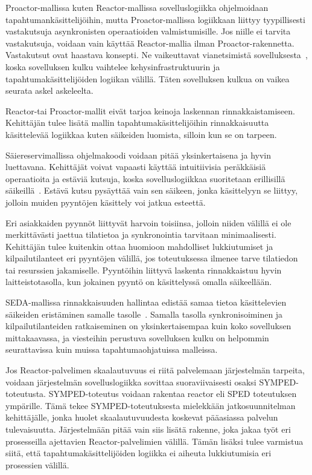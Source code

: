 \documentclass[finnish]{tktltiki2}
\theoremstyle{definition}
\theoremstyle{remark}
\begin{document}
Proactor-mallissa kuten Reactor-mallissa sovelluslogiikka ohjelmoidaan
tapahtumankäsittelijöihin, mutta Proactor-mallissa logiikkaan liittyy
tyypillisesti vastakutsuja 
asynkronisten operaatioiden valmistumisille. Jos 
niille ei tarvita vastakutsuja,
voidaan vain käyttää Reactor-mallia ilman Proactor-rakennetta.
Vastakutsut ovat haastava konsepti. Ne vaikeuttavat vianetsimistä
sovelluksesta~\cite{hu_applying_1998}, koska sovelluksen kulku vaihtelee kehysinfrastruktuurin
ja tapahtumakäsittelijöiden logiikan välillä. Täten sovelluksen
kulkua on vaikea seurata askel askeleelta.

Reactor-tai Proactor-mallit eivät tarjoa keinoja
laskennan rinnakkaistamiseen. Kehittäjän tulee lisätä
mallin tapahtumakäsittelijöihin rinnakkaisuutta käsittelevää
logiikkaa kuten säikeiden luomista, silloin kun se on tarpeen.

Säiereservimallissa ohjelmakoodi voidaan pitää yksinkertaisena ja
hyvin luettavana. Kehittäjät voivat vapaasti käyttää intuitiivisia
peräkkäisiä operaatioita ja estäviä kutsuja, koska sovelluslogiikkaa
suoritetaan erillisillä säikeillä~\cite{hu_applying_1998}. Estävä kutsu pysäyttää vain
sen säikeen, jonka käsittelyyn se liittyy, jolloin muiden
pyyntöjen käsittely voi jatkua esteettä.

Eri asiakkaiden pyynnöt liittyvät harvoin toisiinsa,
jolloin niiden välillä ei ole merkittävästi jaettua tilatietoa ja
synkronointia tarvitaan minimaalisesti.
Kehittäjän tulee kuitenkin ottaa huomioon mahdolliset lukkiutumiset
ja kilpailutilanteet eri pyyntöjen välillä, jos
toteutuksessa ilmenee tarve tilatiedon tai resurssien jakamiselle.
Pyyntöihin liittyvä laskenta rinnakkaistuu hyvin laitteistotasolla,
kun jokainen pyyntö on käsittelyssä omalla säikeellään.

SEDA-mallissa rinnakkaisuuden hallintaa edistää
samaa tietoa käsittelevien säikeiden eristäminen samalle tasolle~\cite{welsh_seda_2001}.
Samalla tasolla synkronisoiminen ja kilpailutilanteiden ratkaiseminen on
yksinkertaisempaa kuin koko sovelluksen mittakaavassa, ja
viesteihin perustuva sovelluksen kulku on helpommin seurattavissa kuin
muissa tapahtumaohjatuissa malleissa.

Jos Reactor-palvelimen skaalautuvuus ei riitä palvelemaan
järjestelmän tarpeita, voidaan järjestelmän sovelluslogiikka
sovittaa suoraviivaisesti osaksi SYMPED-toteutusta. SYMPED-toteutus
voidaan rakentaa reactor eli SPED toteutuksen ympärille. Tämä
tekee SYMPED-toteutuksesta mielekkään jatkosuunnitelman kehittäjälle,
jonka huolet skaalautuvuudesta koskevat pääasiassa palvelun tulevaisuutta.
Järjestelmään pitää vain siis lisätä rakenne, joka
jakaa työt eri prosesseilla ajettavien Reactor-palvelimien välillä.
Tämän lisäksi tulee varmistua siitä, että tapahtumakäsittelijöiden
logiikka ei aiheuta lukkiutumisia eri prosessien välillä.
\end{document}
